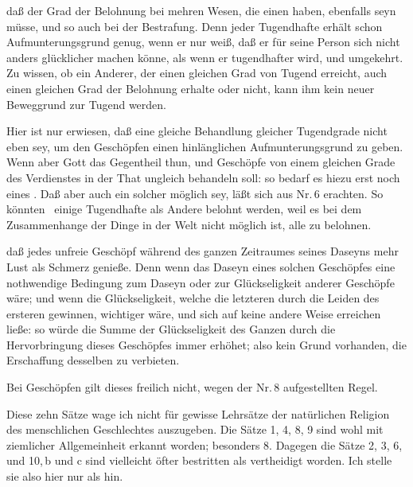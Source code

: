 \begin{aufza}
\begin{aufzb}
\item daß der Grad der Belohnung bei mehren Wesen, die einen  haben, ebenfalls  seyn müsse, und so auch bei der Bestrafung. Denn jeder Tugendhafte erhält schon Aufmunterungsgrund genug, wenn er nur weiß, daß er für seine Person sich nicht anders glücklicher machen könne, als wenn er tugendhafter wird, und umgekehrt. Zu wissen, ob ein Anderer, der einen gleichen Grad von Tugend erreicht, auch einen gleichen Grad der Belohnung erhalte oder nicht, kann ihm kein neuer Beweggrund zur Tugend werden.
\begin{RWanm}
Hier ist nur erwiesen, daß eine gleiche Behandlung gleicher Tugendgrade nicht eben  sey, um den Geschöpfen einen hinlänglichen Aufmunterungsgrund zu geben. Wenn aber Gott das Gegentheil thun, und Geschöpfe von einem gleichen Grade des Verdienstes in der That ungleich behandeln soll: so bedarf es hiezu erst noch eines . Daß aber auch ein solcher möglich sey, läßt sich aus Nr.\,6 erachten. So könnten \zB\ einige Tugendhafte  als Andere belohnt werden, weil es bei dem Zusammenhange der Dinge in der Welt nicht möglich ist, alle  zu belohnen.
\end{RWanm}
\item daß jedes unfreie Geschöpf während des ganzen Zeitraumes seines Daseyns mehr Lust als Schmerz genieße. Denn wenn das Daseyn eines solchen Geschöpfes eine nothwendige Bedingung zum Daseyn oder zur Glückseligkeit anderer Geschöpfe wäre; und wenn die Glückseligkeit, welche die letzteren durch die Leiden des ersteren gewinnen, wichtiger wäre, und sich auf keine andere Weise erreichen ließe: so würde die Summe der Glückseligkeit des Ganzen durch die Hervorbringung dieses Geschöpfes immer erhöhet; also kein Grund vorhanden, die Erschaffung desselben zu verbieten.~
\begin{RWanm}
Bei  Geschöpfen gilt dieses freilich nicht, wegen der Nr.\,8 aufgestellten Regel.
\end{RWanm}
\begin{RWanm} 
Diese zehn Sätze wage ich nicht  für gewisse Lehrsätze der natürlichen Religion des menschlichen Geschlechtes auszugeben. Die Sätze 1, 4, 8, 9 sind wohl mit ziemlicher Allgemeinheit erkannt worden; besonders 8. Dagegen die Sätze 2, 3, 6, und 10,\,b und c sind vielleicht öfter bestritten als vertheidigt worden. Ich stelle sie also hier nur als  hin.
\end{RWanm}
\end{aufzb}
\end{aufza}

